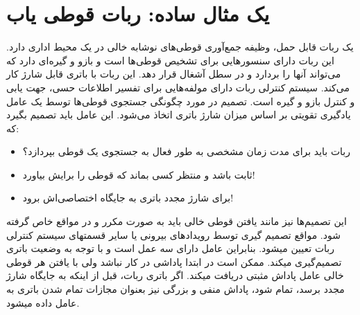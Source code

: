 \section{یک مثال ساده: ربات قوطی یاب}
یک ربات قابل حمل، وظیفه جمع‌آوری قوطی‌های نوشابه خالی در 
یک محیط اداری دارد. این ربات دارای سنسورهایی برای تشخیص قوطی‌ها است و بازو و گیره‌ای دارد که می‌تواند آن\nf ها را بردارد و در سطل آشغال قرار دهد. این ربات  با باتری قابل شارژ کار می‌کند. سیستم کنترلی ربات
دارای مولفه‌هایی برای تفسیر اطلاعات حسی، جهت یابی و کنترل بازو و گیره است. تصمیم در مورد چگونگی جستجوی قوطی‌ها توسط یک عامل یادگیری تقویتی بر اساس میزان شارژ باتری اتخاذ می‌شود. این عامل باید تصمیم بگیرد که: 
\begin{itemize}
	\item  ربات باید برای مدت زمان مشخصی به طور فعال به جستجوی  یک قوطی بپردازد؟
	\item ثابت باشد و منتظر کسی بماند که قوطی را برایش بیاورد!
	\item  برای شارژ مجدد باتری به جایگاه اختصاصی‌اش  برود!
\end{itemize}
این تصمیم‌ها نیز مانند یافتن قوطی خالی باید به صورت مکرر و در مواقع خاص گرفته شود. مواقع تصمیم گیری توسط رویدادهای بیرونی یا سایر قسمت\nf های سیستم کنترلی ربات تعیین می\nf شود. بنابراین عامل
دارای سه عمل است و با توجه به وضعیت باتری تصمیم‌گیری می\nf کند. ممکن است در ابتدا پاداشی در کار نباشد ولی با یافتن هر قوطی خالی عامل پاداش مثبتی دریافت می\nf کند. اگر باتری ربات، قبل از  اینکه به جایگاه شارژ مجدد برسد، تمام شود، پاداش منفی و بزرگی نیز بعنوان مجازات تمام شدن باتری به عامل داده می\nf شود.

